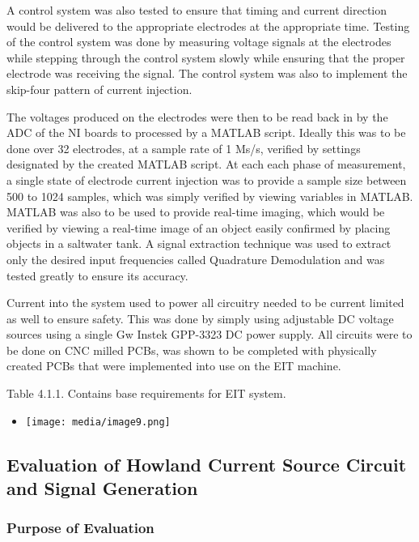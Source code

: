 A control system was also tested to ensure that timing and current
direction would be delivered to the appropriate electrodes at the
appropriate time. Testing of the control system was done by measuring
voltage signals at the electrodes while stepping through the control
system slowly while ensuring that the proper electrode was receiving the
signal. The control system was also to implement the skip-four pattern
of current injection.

The voltages produced on the electrodes were then to be read back in by
the ADC of the NI boards to processed by a MATLAB script. Ideally this
was to be done over 32 electrodes, at a sample rate of 1 Ms/s, verified
by settings designated by the created MATLAB script. At each each phase
of measurement, a single state of electrode current injection was to
provide a sample size between 500 to 1024 samples, which was simply
verified by viewing variables in MATLAB. MATLAB was also to be used to
provide real-time imaging, which would be verified by viewing a
real-time image of an object easily confirmed by placing objects in a
saltwater tank. A signal extraction technique was used to extract only
the desired input frequencies called Quadrature Demodulation and was
tested greatly to ensure its accuracy.

Current into the system used to power all circuitry needed to be current
limited as well to ensure safety. This was done by simply using
adjustable DC voltage sources using a single Gw Instek GPP-3323 DC power
supply. All circuits were to be done on CNC milled PCBs, was shown to be
completed with physically created PCBs that were implemented into use on
the EIT machine.

Table 4.1.1. Contains base requirements for EIT system.

\begin{itemize}
\item
  \texttt{[image: media/image9.png]}
\end{itemize}

\subsection{Evaluation of Howland Current Source Circuit and Signal Generation}\label{evaluation-of-howland-current-source-circuit-and-signal-generation}

\subsubsection{Purpose of Evaluation}\label{purpose-of-evaluation}

